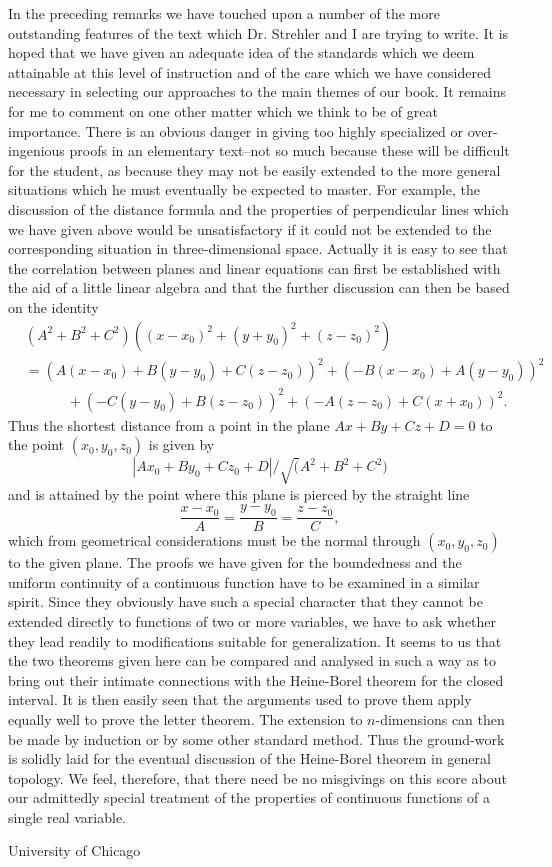 In the preceding remarks we have touched upon a number of the more
outstanding features of the text which Dr. Strehler  and I are trying
to write. It is hoped that we have given an adequate idea of the
standards which we deem attainable at this level of instruction and of
the care which we have considered necessary in selecting our
approaches to the main themes of our book. It remains for me to
comment on one other matter which we think to be of great
importance. There is an obvious danger in giving too highly
specialized or over-ingenious proofs in an elementary text--not so
much because these will be difficult for the student, as because they
may not be easily extended to the more general situations which he
must eventually be expected to master. For example, the discussion of
the distance formula and the properties of perpendicular lines which
we have given above would be unsatisfactory if it could not be
extended to the corresponding situation in three-dimensional
space. Actually it is easy to see that the correlation between planes
and linear equations can first be established with the aid of a little
linear algebra and that the further discussion can then be based on
the identity
\begin{align*} 
& (A^2 + B^2 + C^2) ((x-x_0)^2 + (y+y_0)^2 + (z - z_0)^2)\\
& = (A (x-x_0) + B(y - y_0) + C (z-z_0))^2 + (-B (x-x_0) +
  A(y-y_0))^2\\
& \qquad\quad + (-C(y-y_0) + B(z-z_0))^2 + (-A (z-z_0) + C(x+x_0))^2.
\end{align*}
Thus the shortest distance from a point in the plane $Ax + By + Cz +
D= 0$ to the point $(x_0, y_0, z_0)$ is given by
$$
|Ax_0 + By_0 + Cz_0 + D |/\surd (A^2 + B^2 + C^2)
$$\pageoriginale
and is attained by the point where this plane is pierced by the
straight line
$$
\frac{x-x_0}{A} = \frac{y-y_0}{B} = \frac{z-z_0}{C},
$$
which from geometrical considerations must be the normal through\break
$(x_0, y_0,z_0)$ to the given plane. The proofs we have given for the
boundedness and the uniform continuity of a continuous function have
to be examined in a similar spirit. Since they obviously have such a
special character that they cannot be extended directly to functions
of two or more variables, we have to ask whether they lead readily to
modifications suitable for generalization. It seems to us that the two
theorems given here can be compared  and analysed in such a way as to
bring out their intimate connections with the Heine-Borel theorem for
the closed interval. It is then easily seen that the arguments used to
prove them apply equally well to prove the letter theorem. The
extension to $n$-dimensions can then be made by induction or by some
other standard method. Thus the ground-work is solidly laid for the
eventual discussion of the Heine-Borel theorem in general topology. We
feel, therefore, that there need be no misgivings on this score about
our admittedly special treatment of the properties of continuous
functions of a single real variable.

\bigskip
\bigskip
{\fontsize{9pt}{11pt}\selectfont
University of Chicago}\relax



